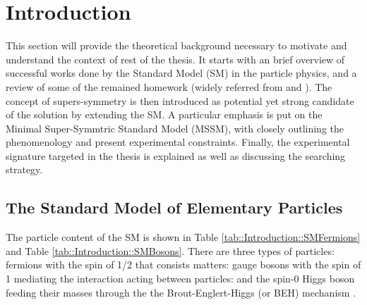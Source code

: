 \section{Introduction} \label{sec::Introduction}
This section will provide the theoretical background necessary to motivate and understand the context of rest of the thesis.
It starts with an brief overview of successful works done by the Standard Model (SM) in the particle physics, and a review of some of the remained homework (widely referred from \cite{PeskinSchroeder} and \cite{HalzenMartin}).
The concept of supers-symmetry is then introduced as potential yet strong candidate of the solution by extending the SM.
A particular emphasis is put on the Minimal Super-Symmtric Standard Model (MSSM), with closely outlining the phenomenology and present experimental constraints.
Finally, the experimental signature targeted in the thesis is explained as well as discussing the searching strategy. \\


\subsection{The Standard Model of Elementary Particles}
The particle content of the SM is shown in Table \ref{tab::Introduction::SMFermions} and Table \ref{tab::Introduction::SMBosons}. There are three types of particles: fermions with the spin of 1/2 that consists matters: gauge bosons with the spin of 1 mediating the interaction acting between particles: and the spin-0 Higgs boson feeding their masses through the the Brout-Englert-Higgs (or BEH) mechanism \cite{SSBBroutEnglert}\cite{SSBHiggs}.  \\

